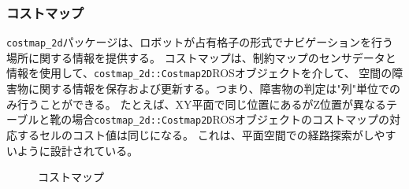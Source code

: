 \subsubsection{コストマップ}
\verb|costmap_2d|パッケージ\cite{auto:costmap2d}は、ロボットが占有格子の形式でナビゲーションを行う場所に関する情報を提供する。
コストマップは、制約マップのセンサデータと情報を使用して、\verb|costmap_2d::Costmap2D|ROSオブジェクトを介して、
空間の障害物に関する情報を保存および更新する。つまり、障害物の判定は"列"単位でのみ行うことができる。
たとえば、XY平面で同じ位置にあるがZ位置が異なるテーブルと靴の場合\verb|costmap_2d::Costmap2D|ROSオブジェクトのコストマップの対応するセルのコスト値は同じになる。
これは、平面空間での経路探索がしやすいように設計されている。

\begin{figure}[h]
  \begin{center}
  \caption{コストマップ}
  \label{auto:costmap_gaiyou}
  \end{center}
\end{figure}

